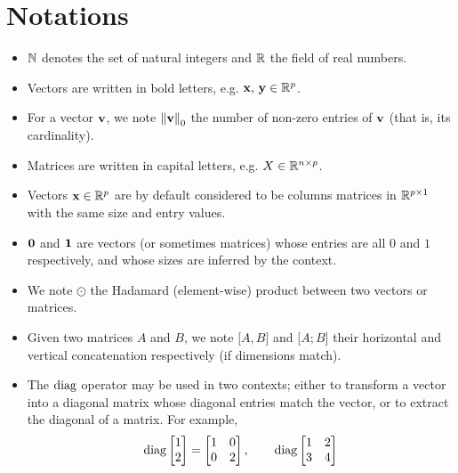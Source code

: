 \cleardoublepage
\chapter*{Notations}

\begin{itemize}
    \item $\mathbb{N}$ denotes the set of natural integers and $\mathbb{R}$ the field of real numbers.
    \item Vectors are written in bold letters, e.g. $\mathbf{x},\, \mathbf{y} \in \mathbb{R}^p$.
    \item For a vector $\mathbf{v}$, we note $\left\lVert\mathbf{v}\right\rVert_0$ the number of non-zero entries of $\mathbf{v}$ (that is, its cardinality).
    \item Matrices are written in capital letters, e.g. $X \in \mathbb{R}^{n \times p}$.
    \item Vectors $\mathbf{x} \in \mathbb{R}^p$ are by default considered to be columns matrices in
        $\mathbb{R}^{p \times 1}$ with the same size and entry values.
    \item $\mathbf{0}$ and $\mathbf{1}$ are vectors (or sometimes matrices) whose entries are all $0$ and $1$ respectively,
        and whose sizes are inferred by the context.
    \item We note $\odot$ the Hadamard (element-wise) product between two vectors or matrices.
    \item Given two matrices $A$ and $B$, we note $\big[ A, B \big]$ and $\big[ A; B \big]$ their horizontal and
        vertical concatenation respectively (if dimensions match).
    \item The $\operatorname*{diag}$ operator may be used in two contexts;
    either to transform a vector into a diagonal matrix whose diagonal entries match the vector,
    or to extract the diagonal of a matrix.
    For example,
    \begin{equation*}
        \diag \begin{bmatrix}
                  1\\
                  2
        \end{bmatrix}
        =
        \begin{bmatrix}
            1 & 0\\
            0 & 2
        \end{bmatrix}
        ,\qquad
        \diag \begin{bmatrix}
                  1 & 2\\
                  3 & 4
        \end{bmatrix}

\end{equation*}
\end{itemize}
